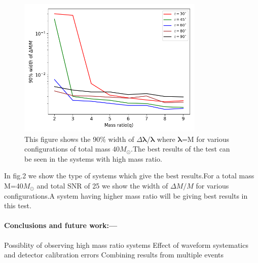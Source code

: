\documentclass[prl,preprintnumbers,twocolumn,eqsecnum,floatfix,a4paper,nofootinbib,superscriptaddress]{revtex4}
\newcommand{\blambda}{\bm{\lambda}}
\begin{document}
\begin{figure}[h]
	\includegraphics*[width=3.5in]{./../../plots/90_percent_width_dM}
	\caption{This figure shows the 90$\%$ width of $\Delta \blambda/\blambda$ where $\blambda$=M for various configurations of total mass $40M_{\odot}$.The best results of the test can be seen in the systems with high mass ratio.}
\end{figure}

In fig.2 we show the type of systems which give the best results.For a total mass M=40$M_{\odot}$ and total SNR of 25 we show the width of $\Delta M/M$ for various configurations.A system having higher mass ratio will be giving best results in this test.

\paragraph{Conclusions and future work:---} 
Possiblity of observing high mass ratio systems 
Effect of waveform systematics and detector calibration errors 
Combining results from multiple events

%


\end{document}
